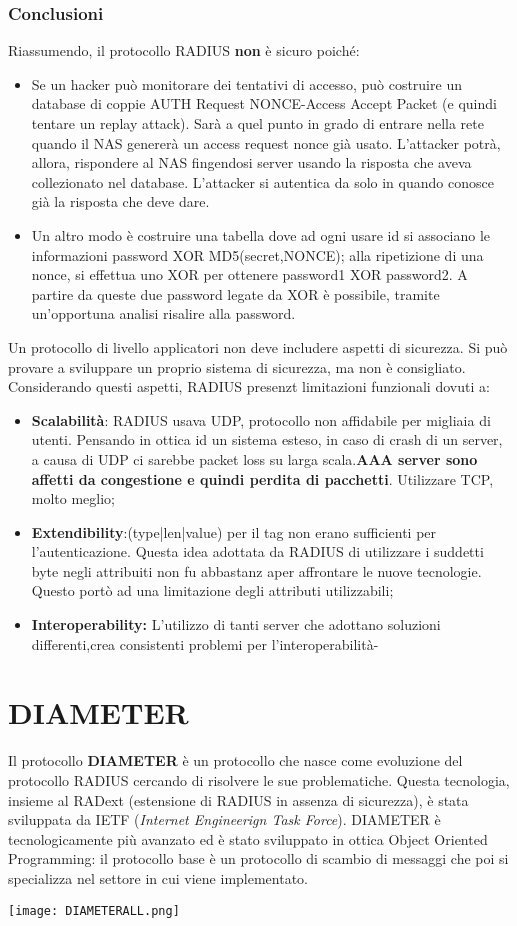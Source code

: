 \documentclass{article}
\theoremstyle{remark}
\begin{document}
\subsubsection{Conclusioni}
Riassumendo, il protocollo RADIUS \textbf{non} è sicuro poiché:\begin{itemize}
    \item Se un hacker può monitorare dei tentativi di accesso, può costruire un database di coppie AUTH Request NONCE-Access Accept Packet (e quindi tentare un replay attack). Sarà a quel punto in grado di entrare nella rete quando il NAS genererà un access request nonce già usato. L'attacker potrà, allora, rispondere al NAS fingendosi server usando la risposta che aveva collezionato nel database. L'attacker si autentica da solo in quando conosce già la risposta che deve dare.
    \item Un altro modo è costruire una tabella dove ad ogni usare id si associano le informazioni password XOR MD5(secret,NONCE); alla ripetizione di una nonce, si effettua uno XOR per ottenere password1 XOR password2. A partire da queste due password legate da XOR è possibile, tramite un'opportuna analisi risalire alla password.
\end{itemize}
Un protocollo di livello applicatori non deve includere aspetti di sicurezza. Si può provare a sviluppare un proprio sistema di sicurezza, ma non è consigliato.
Considerando questi aspetti, RADIUS presenzt limitazioni funzionali dovuti a:\begin{itemize}
    \item \textbf{Scalabilità}: RADIUS usava UDP, protocollo non affidabile per migliaia di utenti. Pensando in ottica id un sistema esteso, in caso di crash di un server, a causa di UDP ci sarebbe packet loss su larga scala.\textbf{AAA server sono affetti da congestione e quindi perdita di pacchetti}. Utilizzare TCP, molto meglio;
    \item \textbf{Extendibility}:(type|len|value) per il tag non erano sufficienti per l'autenticazione. Questa idea adottata da RADIUS di utilizzare i suddetti byte negli attribuiti non fu abbastanz aper affrontare le nuove tecnologie. Questo portò ad una limitazione degli attributi utilizzabili;
    \item \textbf{Interoperability:} L'utilizzo di tanti server che adottano soluzioni differenti,crea consistenti problemi per l'interoperabilità-
\end{itemize}
\section{DIAMETER}
Il protocollo \textbf{DIAMETER} è un protocollo che nasce come evoluzione del protocollo RADIUS cercando di risolvere le sue problematiche. Questa tecnologia, insieme al RADext (estensione di RADIUS in assenza di sicurezza), è stata sviluppata da IETF (\emph{Internet Engineerign Task Force}). DIAMETER è tecnologicamente più avanzato ed è stato sviluppato in ottica Object Oriented Programming: il protocollo base è un protocollo di scambio di messaggi che poi si specializza nel settore in cui viene implementato.\begin{center}
    \texttt{[image: DIAMETERALL.png]}
\end{center}
\end{document}
